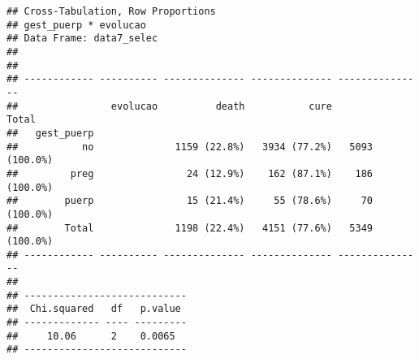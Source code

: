 \documentclass[
]{article}
\newenvironment{Shaded}{\begin{snugshade}}{\end{snugshade}}
\newcommand{\DataTypeTok}[1]{\textcolor[rgb]{0.13,0.29,0.53}{#1}}
\newcommand{\KeywordTok}[1]{\textcolor[rgb]{0.13,0.29,0.53}{\textbf{#1}}}
\newcommand{\NormalTok}[1]{#1}
\newcommand{\OperatorTok}[1]{\textcolor[rgb]{0.81,0.36,0.00}{\textbf{#1}}}
\newcommand{\OtherTok}[1]{\textcolor[rgb]{0.56,0.35,0.01}{#1}}
\newcommand{\StringTok}[1]{\textcolor[rgb]{0.31,0.60,0.02}{#1}}
\begin{document}
\begin{Shaded}
\end{Shaded}

\begin{Shaded}
\end{Shaded}

\begin{verbatim}
## Cross-Tabulation, Row Proportions  
## gest_puerp * evolucao  
## Data Frame: data7_selec  
## 
## 
## ------------ ---------- -------------- -------------- ---------------
##                evolucao          death           cure           Total
##   gest_puerp                                                         
##           no              1159 (22.8%)   3934 (77.2%)   5093 (100.0%)
##         preg                24 (12.9%)    162 (87.1%)    186 (100.0%)
##        puerp                15 (21.4%)     55 (78.6%)     70 (100.0%)
##        Total              1198 (22.4%)   4151 (77.6%)   5349 (100.0%)
## ------------ ---------- -------------- -------------- ---------------
## 
## ----------------------------
##  Chi.squared   df   p.value 
## ------------- ---- ---------
##     10.06      2    0.0065  
## ----------------------------
\end{verbatim}

\begin{Shaded}
\end{Shaded}
\end{document}
